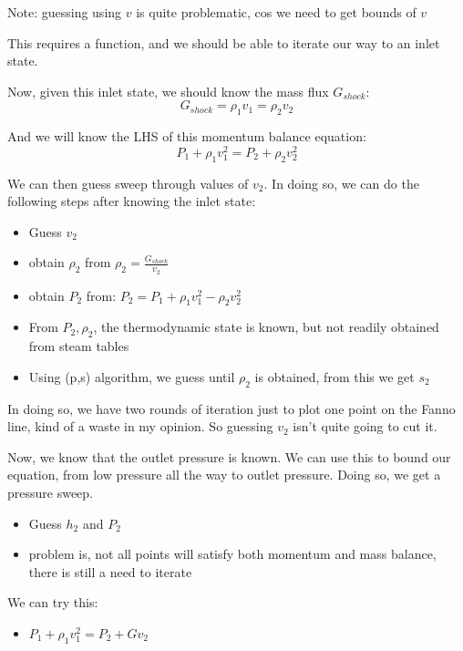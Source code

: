 \documentclass[masters]{ucbthesis}
\renewcommand{\_}{\kern-1.5pt\textunderscore\kern-1.5pt}
\begin{document}
Note: guessing using $v$ is quite problematic, cos we need to get bounds 
of $v$

This requires a function, and we should be able to iterate our way to 
an inlet state.

Now, given this inlet state, we should know the mass flux $G_{shock}$:
\begin{equation*}
	G_{shock} = \rho_1 v_1 = \rho_2 v_2 
\end{equation*}

And we will know the LHS of this momentum balance equation:
\begin{equation*}
	P_1 + \rho_1 v_1^2 = P_2  + \rho_2 v_2^2
\end{equation*}

We can then guess sweep through values of $v_2$. In doing so, we can 
do the following steps after knowing the inlet state:

\begin{itemize}
	\item Guess $v_2$
	\item obtain $\rho_2$ from $\rho_2 = \frac{G_{shock}}{v_2}$
	\item obtain $P_2$ from: $P_2 = P_1 + \rho_1 v_1^2 - \rho_2 v_2^2$
	\item From $P_2,\rho_2$, the thermodynamic state is known, but 
		not readily obtained from steam tables
	\item Using (p,s) algorithm, we guess until $\rho_2$ is obtained, 
		from this we get $s_2$
\end{itemize}

In doing so, we have two rounds of iteration just to plot one point 
on the Fanno line, kind of a waste in my opinion. So guessing $v_2$ isn't 
quite going to cut it. 

Now, we know that the outlet pressure is known. We can use this to bound 
our equation, from low pressure all the way to outlet pressure. Doing so,
we get a pressure sweep.


\begin{itemize}
	\item Guess $h_2$ and $P_2$
	\item problem is, not all points will satisfy both momentum and 
		mass balance, there is still a need to iterate
\end{itemize}

We can try this:

\begin{itemize}
	\item $P_1 + \rho_1 v_1^2 = P_2 + G v_2$
\end{itemize}
\end{document}
